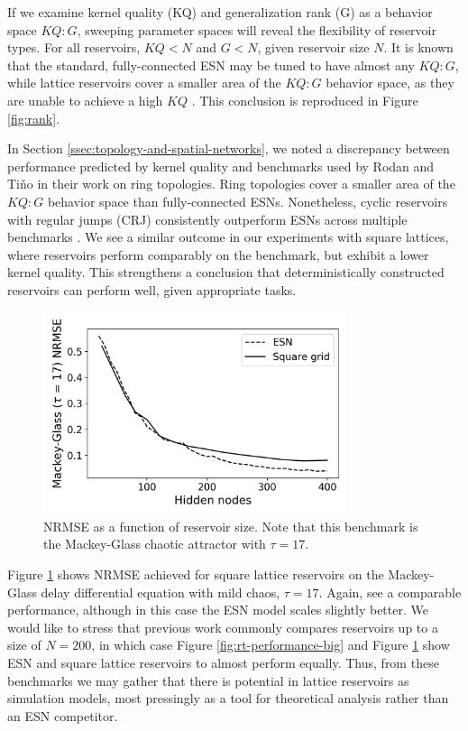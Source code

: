 If we examine kernel quality (KQ) and generalization rank (G) as a behavior
space $KQ:G$, sweeping parameter spaces will reveal the flexibility of reservoir
types. For all reservoirs, $KQ < N$ and $G < N$, given reservoir size $N$. It is
known that the standard, fully-connected ESN may be tuned to have almost any
$KQ:G$, while lattice reservoirs cover a smaller area of the $KQ:G$ behavior
space, as they are unable to achieve a high $KQ$
\cite{mcquillan_role_2019}. This conclusion is reproduced in Figure
\ref{fig:rank}.

In Section \ref{ssec:topology-and-spatial-networks}, we noted a discrepancy
between performance predicted by kernel quality and benchmarks used by Rodan and
Tiňo in their work on ring topologies. Ring topologies cover a smaller area of
the $KQ:G$ behavior space than fully-connected ESNs. Nonetheless, cyclic
reservoirs with regular jumps (CRJ) consistently outperform ESNs across multiple
benchmarks \cite{rodan_simple_2012}. We see a similar outcome in our experiments
with square lattices, where reservoirs perform comparably on the benchmark, but
exhibit a lower kernel quality. This strengthens a conclusion that
deterministically constructed reservoirs can perform well, given appropriate
tasks.

\begin{figure}[htb]
  \centering
  \includegraphics[width=3.5in]{figures/mg17.png}
  \caption{
    NRMSE as a function of reservoir size. Note that this benchmark is the
Mackey-Glass chaotic attractor with $\tau = 17$.
  }
  \label{fig:mg17}
\end{figure}

Figure \ref{fig:mg17} shows NRMSE achieved for square lattice reservoirs on the
Mackey-Glass delay differential equation with mild chaos, $\tau = 17$. Again,
see a comparable performance, although in this case the ESN model scales
slightly better. We would like to stress that previous work commonly compares
reservoirs up to a size of $N = 200$, in which case Figure
\ref{fig:rt-performance-big} and Figure \ref{fig:mg17} show ESN and square
lattice reservoirs to almost perform equally. Thus, from these benchmarks we may
gather that there is potential in lattice reservoirs as simulation models, most
pressingly as a tool for theoretical analysis rather than an ESN competitor.

